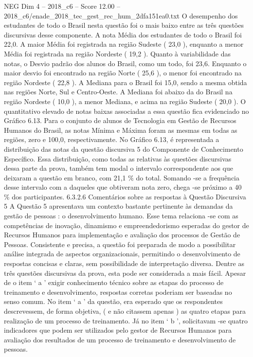 \begin{textsample}{NEG Dim 4 – 2018\_c6 – Score 12.00 – 2018\_c6/enade\_2018\_tec\_gest\_rec\_hum\_2dfa151ea0.txt}
O desempenho dos estudantes de todo o Brasil nesta questão foi o mais baixo entre as três questões discursivas desse componente.
A nota Média dos estudantes de todo o Brasil foi 22,0.
A maior Média foi registrada na região Sudeste ( 23,0 ), enquanto a menor Média foi registrada na região Nordeste ( 19,2 ).
Quanto à variabilidade das notas, o Desvio padrão dos alunos do Brasil, como um todo, foi 23,6.
Enquanto o maior desvio foi encontrado na região Norte ( 25,6 ), o menor foi encontrado na região Nordeste ( 22,8 ).
A Mediana para o Brasil foi 15,0, sendo a mesma obtida nas regiões Norte, Sul e Centro-Oeste.
A Mediana foi abaixo da do Brasil na região Nordeste ( 10,0 ), a menor Mediana, e acima na região Sudeste ( 20,0 ).
O quantitativo elevado de notas baixas associadas a essa questão fica evidenciado no Gráfico 6.13.
Para o conjunto de alunos de Tecnologia em Gestão de Recursos Humanos do Brasil, as notas Mínima e Máxima foram as mesmas em todas as regiões, zero e 100,0, respectivamente.
No Gráfico 6.13, é representada a distribuição das notas da questão discursiva 5 do Componente de Conhecimento Específico.
Essa distribuição, como todas as relativas às questões discursivas dessa parte da prova, também tem modal o intervalo correspondente aos que deixaram a questão em branco, com 21,1 \% do total.
Somando -se a frequência desse intervalo com a daqueles que obtiveram nota zero, chega -se próximo a 40 \% dos participantes. 6.3.2.6 Comentários sobre as respostas à Questão Discursiva 5 A Questão 5 apresentava um contexto bastante pertinente às demandas da gestão de pessoas : o desenvolvimento humano.
Esse tema relaciona -se com as competências de inovação, dinamismo e empreendedorismo esperadas do gestor de Recursos Humanos para implementação e avaliação dos processos de Gestão de Pessoas.
Consistente e precisa, a questão foi preparada de modo a possibilitar análise integrada de aspectos organizacionais, permitindo o desenvolvimento de respostas concisas e claras, sem possibilidade de interpretação diversa.
Dentre as três questões discursivas da prova, esta pode ser considerada a mais fácil.
Apesar de o item ‘ a ’ exigir conhecimento técnico sobre as etapas do processo de treinamento e desenvolvimento, respostas corretas poderiam ser baseadas no senso comum.
No item ‘ a ’ da questão, era esperado que os respondentes descrevessem, de forma objetiva, ( e não citassem apenas ) as quatro etapas para realização de um processo de treinamento.
Já no item ‘ b ’, solicitavam -se quatro indicadores que podem ser utilizados pelo gestor de Recursos Humanos para avaliação dos resultados de um processo de treinamento e desenvolvimento de pessoas.

\end{textsample}
